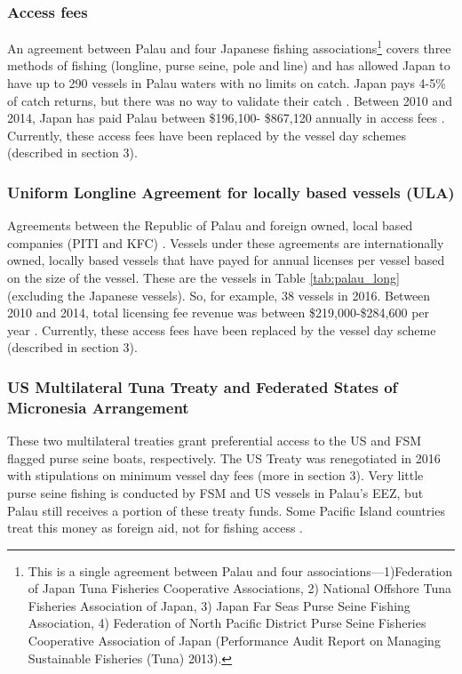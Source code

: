 \documentclass[9pttwoside,lineno]{pnas-new}
\begin{document}
%


\subsubsection{Access fees}

An agreement between Palau and four Japanese fishing associations\footnote{This is a single agreement between Palau and four associations—1)Federation of Japan Tuna Fisheries Cooperative Associations, 2) National Offshore Tuna Fisheries Association of Japan, 3) Japan Far Seas Purse Seine Fishing Association, 4) Federation of North Pacific District Purse Seine Fisheries Cooperative Association of Japan (Performance Audit Report on Managing Sustainable Fisheries (Tuna) 2013).} covers three methods of fishing (longline, purse seine, pole and line) and has allowed Japan to have up to 290 vessels in Palau waters with no limits on catch. Japan pays 4-5\% of catch returns, but there was no way to validate their catch \citep{Tewid2013}. Between 2010 and 2014, Japan has paid Palau between \$196,100- \$867,120 annually in access fees \citep{Gillett2016}. Currently, these access fees have been replaced by the vessel day schemes (described in section 3).

\subsubsection{Uniform Longline Agreement for locally based vessels (ULA)}
 
Agreements between the Republic of Palau and foreign owned, local based companies (PITI and KFC) \citep{Tewid2013}. Vessels under these agreements are internationally owned, locally based vessels that have payed for annual licenses per vessel based on the size of the vessel. These are the vessels in Table \ref{tab:palau_long} (excluding the Japanese vessels). So, for example, 38 vessels in 2016. Between 2010 and 2014, total licensing fee revenue was between \$219,000-\$284,600 per year \citep{Gillett2016}. Currently, these access fees have been replaced by the vessel day scheme (described in section 3).


\subsubsection{US Multilateral Tuna Treaty and Federated States of Micronesia Arrangement}

These two multilateral treaties grant preferential access to the US and FSM flagged purse seine boats, respectively.  The US Treaty was renegotiated in 2016 with stipulations on minimum vessel day fees (more in section 3). Very little purse seine fishing is conducted by FSM and US vessels in Palau’s EEZ, but Palau still receives a portion of these treaty funds. Some Pacific Island countries treat this money as foreign aid, not for fishing access \citep{Gillett2016}. 
\end{document}
